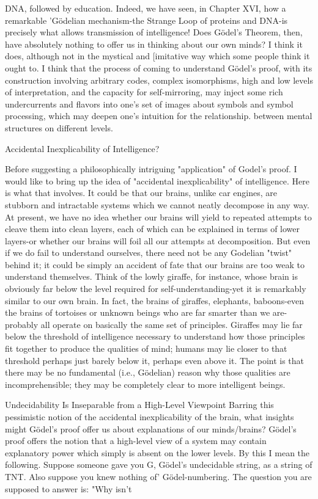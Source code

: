 DNA, followed by education. Indeed, we have seen, in Chapter XVI, how a remarkable
'Gödelian mechanism-the Strange Loop of proteins and DNA-is precisely what allows
transmission of intelligence!
        Does Gödel’s Theorem, then, have absolutely nothing to offer us in thinking
about our own minds? I think it does, although not in the mystical and [imitative way
which some people think it ought to. I think that the process of coming to understand
Gödel’s proof, with its construction involving arbitrary codes, complex isomorphisms,
high and low levels of interpretation, and the capacity for self-mirroring, may inject some
rich undercurrents and flavors into one's set of images about symbols and symbol
processing, which may deepen one's intuition for the relationship. between mental
structures on different levels.

                       Accidental Inexplicability of Intelligence?

Before suggesting a philosophically intriguing "application" of Godel's proof. I would
like to bring up the idea of "accidental inexplicability" of intelligence. Here is what that
involves. It could be that our brains, unlike car engines, are stubborn and intractable
systems which we cannot neatly decompose in any way. At present, we have no idea
whether our brains will yield to repeated attempts to cleave them into clean layers, each
of which can be explained in terms of lower layers-or whether our brains will foil all our
attempts at decomposition.
        But even if we do fail to understand ourselves, there need not be any Godelian
"twist" behind it; it could be simply an accident of fate that our brains are too weak to
understand themselves. Think of the lowly giraffe, for instance, whose brain is obviously
far below the level required for self-understanding-yet it is remarkably similar to our own
brain. In fact, the brains of giraffes, elephants, baboons-even the brains of tortoises or
unknown beings who are far smarter than we are-probably all operate on basically the
same set of principles. Giraffes may lie far below the threshold of intelligence necessary
to understand how those principles fit together to produce the qualities of mind; humans
may lie closer to that threshold perhaps just barely below it, perhaps even above it. The
point is that there may be no fundamental (i.e., Gödelian) reason why those qualities are
incomprehensible; they may be completely clear to more intelligent beings.

        Undecidability Is Inseparable from a High-Level Viewpoint
Barring this pessimistic notion of the accidental inexplicability of the brain, what insights
might Gödel’s proof offer us about explanations of our minds/brains? Gödel’s proof
offers the notion that a high-level view of a system may contain explanatory power which
simply is absent on the lower levels. By this I mean the following. Suppose someone
gave you G, Gödel’s undecidable string, as a string of TNT. Also suppose you knew
nothing of' Gödel-numbering. The question you are supposed to answer is: "Why isn't




